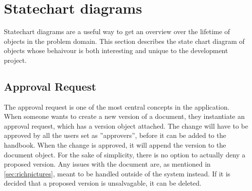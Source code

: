 \section{Statechart diagrams} \label{sec:statechart}
Statechart diagrams are a useful way to get an overview over the lifetime of objects in the problem domain.
This section describes the state chart diagram of objects whose behaivour is both interesting and unique to the development project.

\subsection{Approval Request}
The approval request is one of the most central concepts in the application.
When someone wants to create a new version of a document, they instantiate an approval request, which has a version object attached.
The change will have to be approved by all the users set as ''approvers'', before it can be added to the handbook.
When the change is approved, it will append the version to the document object.
For the sake of simplicity, there is no option to actually deny a proposed version.
Any issues with the document are, as mentioned in \cref{sec:richpictures}, meant to be handled outside of the system instead. If it is decided that a proposed version is unsalvagable, it can be deleted.

\begin{figure}[H]
	\centering
{}
\end{figure}

